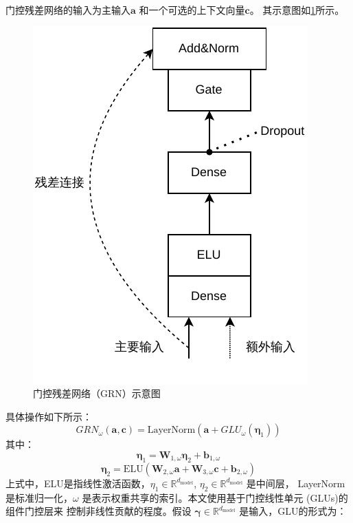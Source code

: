 门控残差网络的输入为主输入$\mathbf{a}$
和一个可选的上下文向量$\mathbf{c}$。
其示意图如\ref{fig:GRN}所示。
\begin{figure}[H]
    \centering
    \includegraphics{figure/残差连接.vision.pdf}
    \caption{门控残差网络（GRN）示意图}
    \label{fig:GRN}
\end{figure}
具体操作如下所示：
\begin{equation}
    GRN_{\omega}(\mathbf{a}, \mathbf{c}) = \text{LayerNorm}(\mathbf{a} + GLU_{\omega}(\boldsymbol{\eta}_1))
\end{equation}
其中：
\begin{equation}
    \boldsymbol{\eta}_1 = \mathbf{W}_{1,\omega} \boldsymbol{\eta}_2 + \mathbf{b}_{1,\omega}
\end{equation}
\begin{equation}
    \boldsymbol{\eta}_2 = \text{ELU}(\mathbf{W}_{2,\omega} \mathbf{a} + \mathbf{W}_{3,\omega} \mathbf{c} + \mathbf{b}_{2,\omega})
    \label{eq:eta2}
\end{equation}
上式中，ELU是指线性激活函数，$\eta_1 \in \mathbb{R}^{d_{\text{model}}}$, $\eta_2 \in \mathbb{R}^{d_{\text{model}}}$ 是中间层，
LayerNorm是标准归一化，$\omega$ 是表示权重共享的索引。本文使用基于门控线性单元 (GLUs)的组件门控层来
控制非线性贡献的程度。假设 $\boldsymbol{\gamma } \in \mathbb{R}^{d_{\text{model}}}$ 是输入，GLU的形式为：
